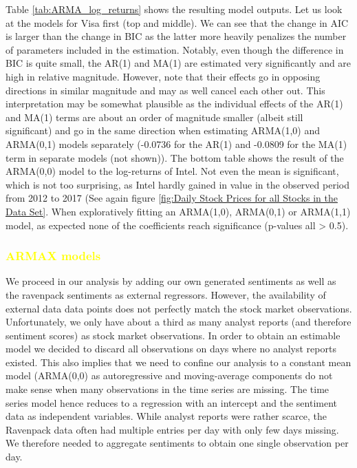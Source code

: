 Table \ref{tab:ARMA_log_returns} shows the resulting model outputs. Let us look at the models for Visa first (top and middle). We can see that the change in AIC is larger than the change in BIC as the latter more heavily penalizes the number of parameters included in the estimation. Notably, even though the difference in BIC is quite small, the AR(1) and MA(1) are estimated very significantly and are high in relative magnitude. However, note that their effects go in opposing directions in similar magnitude and may as well cancel each other out. This interpretation may be somewhat plausible as the individual effects of the AR(1) and MA(1) terms are about an order of magnitude smaller (albeit still significant) and go in the same direction when estimating ARMA(1,0) and ARMA(0,1) models separately (-0.0736 for the AR(1) and -0.0809 for the MA(1) term in separate models (not shown)). 
The bottom table shows the result of the ARMA(0,0) model to the log-returns of Intel. Not even the mean is significant, which is not too surprising, as Intel hardly gained in value in the observed period from 2012 to 2017 (See again figure \ref{fig:Daily Stock Prices for all Stocks in the Data Set}. When exploratively fitting an ARMA(1,0), ARMA(0,1) or ARMA(1,1) model, as expected none of the coefficients reach significance (p-values all > 0.5). 

\subsubsection{\textcolor{yellow}{ARMAX models}}
We proceed in our analysis by adding our own generated sentiments as well as the ravenpack sentiments as external regressors. However, the availability of external data data points does not perfectly match the stock market observations. Unfortunately, we only have about a third as many analyst reports (and therefore sentiment scores) as stock market observations. In order to obtain an estimable model we decided to discard all observations on days where no analyst reports existed. This also implies that we need to confine our analysis to a constant mean model (ARMA(0,0) as autoregressive and moving-average components do not make sense when many observations in the time series are missing. The time series model hence reduces to a regression with an intercept and the sentiment data as independent variables. While analyst reports were rather scarce, the Ravenpack data often had multiple entries per day with only few days missing. We therefore needed to aggregate sentiments to obtain one single observation per day. 

